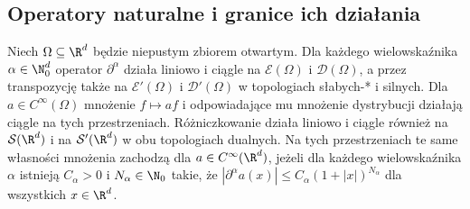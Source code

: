 \subsection{Operatory naturalne i granice ich działania}

\begin{stwierdzenie}
\label{prop:ops25}
Niech $\Omega\subseteq\R^d$ będzie niepustym zbiorem otwartym.
Dla każdego wielowskaźnika $\alpha\in\N_0^d$
operator $\partial^\alpha$ działa liniowo i ciągle na
$\mathcal E(\Omega)$ i $\mathcal D(\Omega)$, a przez
transpozycję także na $\mathcal E'(\Omega)$ i
$\mathcal D'(\Omega)$ w topologiach słabych-* i silnych.
Dla $a\in C^\infty(\Omega)$ mnożenie $f\mapsto af$
i odpowiadające mu mnożenie dystrybucji działają ciągle
na tych przestrzeniach.
Różniczkowanie działa liniowo i ciągle również na
$\mathcal S(\R^d)$ i na $\mathcal S'(\R^d)$ w obu
topologiach dualnych. Na tych przestrzeniach
te same własności mnożenia zachodzą dla
$a\in C^\infty(\R^d)$, jeżeli dla każdego
wielowskaźnika $\alpha$ istnieją $C_\alpha>0$ i
$N_\alpha\in\N_0$ takie, że
$|\partial^\alpha a(x)|\le C_\alpha(1+|x|)^{N_\alpha}$
dla wszystkich $x\in\R^d$.
\end{stwierdzenie}
